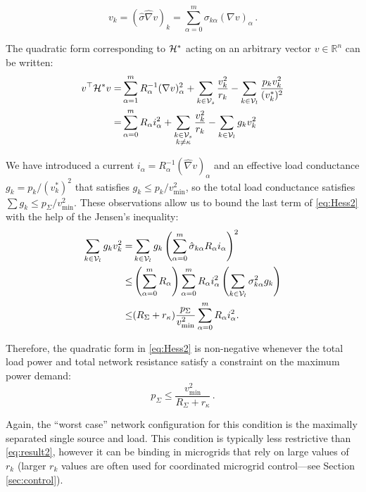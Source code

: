 \documentclass[letterpaper, 10 pt, conference]{ieeeconf}
\begin{document}
\begin{equation}
	v_k = (\hat \sigma\hat\nabla v)_k =  \sum_{\alpha=0}^m \sigma_{k\alpha} (\nabla v)_\alpha\,.
\end{equation}

The quadratic form corresponding to ${\cal H}^*$ acting on an arbitrary vector $v \in \mathbb{R}^n$ can be written:
\begin{align}
 v^\top {\cal H}^* v =&  \sum_{\alpha=1}^m R_{\alpha}^{-1}(\nabla v)_\alpha^2 + \sum_{k\in {\cal V}_s}\frac{v_k^2}{r_k} - \sum_{k\in{\cal V}_l} \frac{p_k v_k^2}{(v_k^*)^2} \nonumber\\
 =& \sum_{\alpha=0}^m R_{\alpha}i_\alpha^2 + \sum_{\substack{ k\in {\cal V}_s \\ k\neq \kappa}}\frac{v_k^2}{r_k}
- \sum_{k \in{\cal V}_l} g_k v_k^2\label{eq:Hess2}
\end{align}

We have introduced a current $i_\alpha = R_\alpha^{-1}(\hat\nabla v)_\alpha$ and an effective load conductance $g_k = p_k/(v_k^*)^2 $ that satisfies $g_k \leq p_k/ v_{\min}^2$, so the total load conductance satisfies $\sum g_k \leq p_\Sigma / v_{\min}^2$. These observations allow us to bound the last term of \eqref{eq:Hess2} with the help of the Jensen's inequality:
\begin{align}
 \sum_{k \in{\cal V}_l} g_k v_k^2 =& \sum_{k \in{\cal V}_l} g_k \left(\sum_{\alpha=0}^m \hat \sigma_{k\alpha} R_\alpha i_\alpha\right)^2 \nonumber\\
    \leq & \left(\sum_{\alpha=0}^m R_\alpha\right)\sum_{\alpha=0}^m R_\alpha i_\alpha^2 \left(\sum_{k\in{\cal V}_l} \sigma_{k\alpha}^2 g_k\right) \nonumber\\
    \leq &(R_\Sigma + r_\kappa )  \frac{p_\Sigma}{v_{\min}^2} \sum_{\alpha=0}^m R_\alpha i_\alpha^2. 
\end{align}

Therefore, the quadratic form in \eqref{eq:Hess2} is non-negative whenever the total load power and total network resistance satisfy a constraint on the maximum power demand:
\begin{equation}\label{eq:result3}
	p_\Sigma \leq \frac{v_{\min}^2}{R_\Sigma + r_\kappa}\,.
\end{equation}

Again, the ``worst case'' network configuration for this condition is the maximally separated single source and load. This condition is typically less restrictive than \eqref{eq:result2}, however it can be binding in microgrids that rely on large values of $r_k$ (larger $r_k$ values are often used for coordinated microgrid control---see Section \ref{sec:control}).
\end{document}
